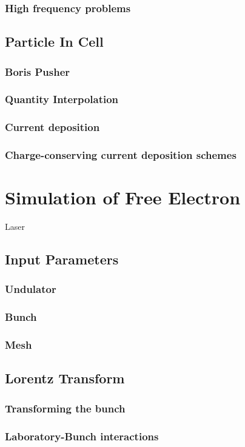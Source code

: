 \documentclass[10pt]{report}
\let\Chapter\chapter
\def\chapter{\addtocontents{lol}{\protect\addvspace{10pt}}\Chapter}
\begin{document}
\subsection{High frequency problems}
\section{Particle In Cell}
\subsection{Boris Pusher}
\subsection{Quantity Interpolation}
\subsection{Current deposition } \label{current_dep}
\subsection{Charge-conserving current deposition schemes}
\chapter{Simulation of Free Electron} Laser
\section{Input Parameters}
\subsection{Undulator}
\subsection{Bunch}
\subsection{Mesh}
\section{Lorentz Transform } \label{ltransform}
\subsection{Transforming the bunch } \label{bunch_transform}
\subsection{Laboratory-Bunch interactions}
\end{document}
